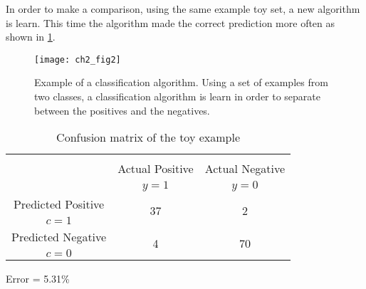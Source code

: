	In order to make a comparison, using the same example toy set, a new algorithm is learn. This 
time the algorithm made the correct prediction more often as shown in \figurename{ \ref{fig:ch2:2}}.

\begin{figure}[t!]
	\centering
	\texttt{[image: ch2\_fig2]}
	\caption{Example of a classification algorithm. Using a set of examples from two classes, a 
	classification algorithm is learn in order to separate between the positives and the negatives. }
	\label{fig:ch2:2}
\end{figure}

    	\begin{table}[!t]
		\centering
		\footnotesize
    \begin{tabular}{c|c|c}
      \multicolumn{3}{c}{}\\
			\multicolumn{1}{c|}{}  & Actual Positive& Actual Negative \\
			\multicolumn{1}{c|}{} & $y=1$& $y=0$ \\
			\hline
			Predicted Positive 		& \multirow{ 2}{*}{37} & \multirow{ 
			2}{*}{2} \\
			$c=1$ & &\\
			\hline
			Predicted Negative  	& \multirow{ 2}{*}{4} & \multirow{ 
			2}{*}{70} \\
			$c=0$ & &\\
		\end{tabular}
		\caption{Confusion matrix of the toy example}
		\label{tab:ch2:2}
  \end{table}  
  Error = 5.31\%
  
